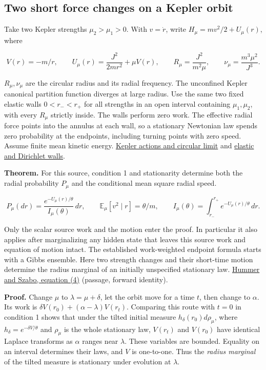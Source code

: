 \documentclass[11pt,a4paper]{article}
\begin{document}
\subsection{Two short force changes on a Kepler
orbit}\label{two-short-force-changes-on-a-kepler-orbit}

Take two Kepler strengths \(\mu_2>\mu_1>0\). With \(v=\dot r\), write
\(H_\mu=mv^2/2+U_\mu(r)\), where

\[
 V(r)=-m/r,\qquad U_\mu(r)=\frac{J^2}{2mr^2}+\mu V(r),\qquad
 R_\mu=\frac{J^2}{m^2\mu},\qquad \nu_\mu=\frac{m^3\mu^2}{J^3}.
\]

\(R_\mu,\nu_\mu\) are the circular radius and its radial frequency. The
unconfined Kepler canonical partition function diverges at large radius.
Use the same two fixed elastic walls \(0<r_-<r_+\) for all strengths in
an open interval containing \(\mu_1,\mu_2\), with every \(R_\mu\)
strictly inside. The walls perform zero work. The effective radial force
points into the annulus at each wall, so a stationary Newtonian law
spends zero probability at the endpoints, including turning points with
zero speed. Assume finite mean kinetic energy.
\href{self-sufficiency-contrast.md\#passivity-under-cyclic-changes-of-the-attraction}{Kepler
actions and circular limit} and \href{dirichlet-wall-impulse.md}{elastic
and Dirichlet walls}.

\textbf{Theorem.} For this source, condition 1 and stationarity
determine both the radial probability \(P_\mu\) and the conditional mean
square radial speed.

\[
 P_\mu(dr)=\frac{e^{-U_\mu(r)/\theta}}{I_\mu(\theta)}\,dr,\qquad
 \mathbb E_\mu[v^2\mid r]=\theta/m,\qquad
 I_\mu(\theta)=\int_{r_-}^{r_+} e^{-U_\mu(r)/\theta}\,dr .           \tag{8}
\]

Only the scalar source work and the motion enter the proof. In
particular it also applies after marginalizing any hidden state that
leaves this source work and equation of motion intact. The established
work-weighted endpoint formula starts with a Gibbs ensemble. Here two
strength changes and their short-time motion determine the radius
marginal of an initially unspecified stationary law.
\href{https://doi.org/10.1073/pnas.071034098}{Hummer and Szabo, equation
(4)} (passage, forward identity).

\textbf{Proof.} Change \(\mu\) to \(\lambda=\mu+\delta\), let the orbit
move for a time \(t\), then change to \(\alpha\). Its work is
\(\delta V(r_0)+(\alpha-\lambda)V(r_t)\). Comparing this route with
\(t=0\) in condition 1 shows that under the tilted initial measure
\(h_\delta(r_0)d\rho_\mu\), where \(h_\delta=e^{-\delta V/\theta}\) and
\(\rho_\mu\) is the whole stationary law, \(V(r_t)\) and \(V(r_0)\) have
identical Laplace transforms as \(\alpha\) ranges near \(\lambda\).
These variables are bounded. Equality on an interval determines their
laws, and \(V\) is one-to-one. Thus the \emph{radius marginal} of the
tilted measure is stationary under evolution at \(\lambda\).
\end{document}
